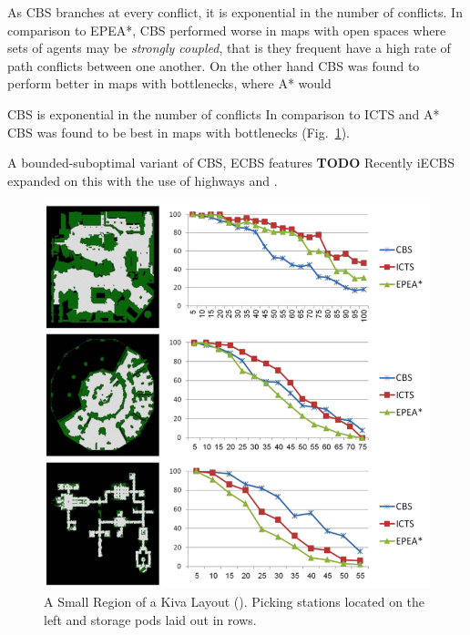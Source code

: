 \documentclass[a4paper,11pt]{article}
\begin{document}
As CBS branches at every conflict, it is exponential in the number of conflicts. In comparison to EPEA*, CBS performed worse in maps with open spaces where sets of agents may be \textit{strongly coupled}, that is they frequent have a high rate of path conflicts between one another. On the other hand CBS was found to perform better in maps with bottlenecks, where A* would 


CBS is exponential in the number of conflicts In comparison to ICTS and A* CBS was found to be best in maps with bottlenecks (Fig.~\ref{cbsresults1}).

A bounded-suboptimal variant of CBS, ECBS features \cite{barer2014suboptimal} \textbf{TODO} Recently iECBS expanded on this with the use of highways and  \cite{cohen2016improved}.

\begin{figure}[!htb]
	\centering \tiny
	\begin{minipage}{0.4\textwidth}
	\centering
	\includegraphics[width=\linewidth]{graphics/cbsresults1}
	\caption{A Small Region of a Kiva Layout (\cite{sharon2015conflict}). Picking stations located on the left and storage pods laid out in rows.}
	\label{cbsresults1}
	\end{minipage}
	\begin{minipage}{0.4\linewidth}
		\centering

\end{minipage}
\end{figure}
\end{document}
